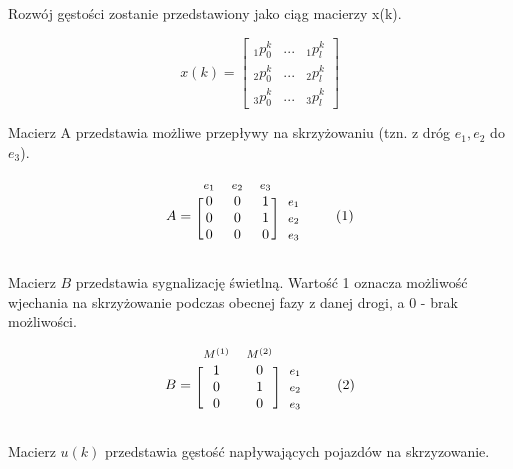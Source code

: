 \documentclass[12pt]{book}
\newcommand\addtag{\refstepcounter{equation}\tag{\theequation}}
\begin{document}
Rozwój gęstości zostanie przedstawiony jako ciąg macierzy x(k).

\[x(k)= \begin{bmatrix}
_1p^k_0 & ... & _1p^k_l \\
_2p^k_0 & ... & _2p^k_l \\
_3p^k_0 & ... & _3p^k_l 
\end{bmatrix}  \]

Macierz A przedstawia możliwe przepływy na skrzyżowaniu (tzn. z dróg $e_1,e_2$ do $e_3$).

\begin{equation*}
  A=
  \begin{blockarray}{*{3}{c} l}
    \begin{block}{*{3}{>{$\footnotesize}c<{$}} l}
      $e_1$ & $e_2$ & $e_3$ \\
    \end{block}
    \begin{block}{[*{3}{c}]>{$\footnotesize}l<{$}}
       0 & 0 & 1 & $e_1$ \\
       0 & 0 & 1 & $e_2$ \\
       0 & 0 & 0 & $e_3$ \\
    \end{block}
  \end{blockarray} \addtag
\end{equation*}


Macierz $B$ przedstawia sygnalizację świetlną. Wartość 1 oznacza możliwość wjechania na skrzyżowanie podczas obecnej fazy z danej drogi, a 0 - brak możliwości.

\begin{equation*}
  B=
  \begin{blockarray}{*{2}{c} l}
    \begin{block}{*{2}{>{$\footnotesize}c<{$}} l}
      $M^{(1)}$ & $M^{(2)}$ \\
    \end{block}
    \begin{block}{[*{2}{c}]>{$\footnotesize}l<{$}}
       1 & 0 & $e_1$ \\
       0 & 1 & $e_2$ \\
       0 & 0 & $e_3$ \\
    \end{block}
  \end{blockarray} \addtag
\end{equation*}

Macierz $u(k)$ przedstawia gęstość napływających pojazdów  na skrzyzowanie.
\end{document}
